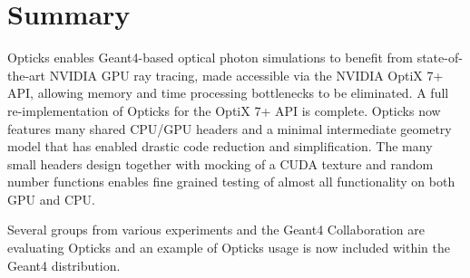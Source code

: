 \documentclass{webofc}
\begin{document}
\section{Summary}
%
Opticks enables Geant4-based optical photon simulations to benefit from 
state-of-the-art NVIDIA GPU ray tracing, made accessible via the NVIDIA OptiX 7+ API,
allowing memory and time processing bottlenecks to be eliminated. 
A full re-implementation of Opticks for the OptiX 7+ API is complete. 
Opticks now features many shared CPU/GPU headers and a minimal intermediate geometry model 
that has enabled drastic code reduction and simplification. 
The many small headers design together with mocking of a CUDA texture and 
random number functions enables fine grained testing of almost all functionality 
on both GPU and CPU.

Several groups from various experiments and the Geant4 Collaboration are evaluating Opticks
and an example of Opticks usage is now included within the Geant4 distribution. 
%
%
\newpage
\end{document}
